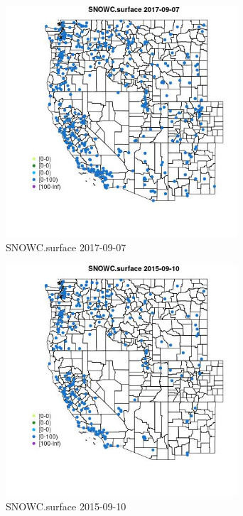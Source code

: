 \begin{figure} 
\centering  
\includegraphics[width=0.77\textwidth]{Code_Outputs/Report_ML_input_PM25_Step4_part_e_de_duplicated_aves_compiled_2019-05-21wNAs_MapObsSNOWCsurface2017-09-07.jpg} 
\caption{\label{fig:Report_ML_input_PM25_Step4_part_e_de_duplicated_aves_compiled_2019-05-21wNAsMapObsSNOWCsurface2017-09-07}SNOWC.surface 2017-09-07} 
\end{figure} 
 

\begin{figure} 
\centering  
\includegraphics[width=0.77\textwidth]{Code_Outputs/Report_ML_input_PM25_Step4_part_e_de_duplicated_aves_compiled_2019-05-21wNAs_MapObsSNOWCsurface2015-09-10.jpg} 
\caption{\label{fig:Report_ML_input_PM25_Step4_part_e_de_duplicated_aves_compiled_2019-05-21wNAsMapObsSNOWCsurface2015-09-10}SNOWC.surface 2015-09-10} 
\end{figure} 
 

